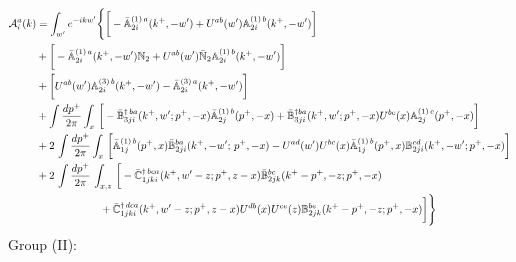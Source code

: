 \documentclass[10pt]{article}
\def\mf#1{\mathbb{#1}}
\numberwithin{equation}{section}
\begin{document}
\begin{align}
         {\cal A}^{a}_{i}(k) & = \int_{w^{\prime}}e^{-ikw^{\prime}} \Bigg\{\bigg[-\bar{\mf{A}}^{(1)\,a}_{2i}(k^{+},-w^{\prime})+U^{ab}(w^{\prime})\mf{A}^{(1)\, b}_{2i}(k^{+},
         - w^{\prime})\bigg]\notag \\ & +\bigg[-\bar{\mf{A}}^{(1)\,a}_{2i}(k^{+},-w^{\prime})\mf{N}_{2}+ U^{ab}(w^{\prime})\bar{\mf{N}}_{2}\mf{A}^{ (1)\, b}_{2i}(k^{+},-w^{\prime})\bigg]\notag 
         \\ & +\bigg[U^{ab}(w^{\prime})\mf{A}^{(3)\, b}_{2i}(k^{+},- w^{\prime})-\Bar{\mf{A}}^{(3)\, a}_{2i}(k^{+}, - w^{\prime})\bigg]\notag 
         \\ & 
         +\int \frac{dp^{+}}{2\pi}\int_{x}\,\bigg[-\Bar{\mf{B}}^{\dagger\, ba}_{3ji}(k^{+}, w^{\prime}; p^{+}, -x)\Bar{\mf{A}}^{(1)\,b}_{2j}(p^{+}, - x)
         + \Bar{\mf{B}}^{\dagger ba}_{3ji}(k^{+},w^{\prime}; p^{+},-x) U^{bc}(x) \mf{A}^{(1)\, c}_{2j}(p^{+},- x)\bigg]\notag
         \\ & 
         +2\,\int \frac{dp^{+}}{2\pi}\int_{x}\,\bigg[ \Bar{\mf{A}}^{(1)\, b}_{1j}(p^{+}, x)\Bar{\mf{B}}^{ba}_{2ji}(k^{+},-w^{\prime};\,p^{+}, -x) -U^{ad}(w^\prime)U^{bc}(x) \bar{\mf{A}}^{(1)\, b}_{1j}(p^+,x) {\mf{B}}^{cd}_{2ji} (k^+, -w^\prime;p^+, -x)\bigg]\notag 
         \\ & 
         +2\, \int \frac{dp^{+}}{2\pi}\,\int_{x,z}\, \bigg[-\Bar{\mf{C}}^{\dagger\, bca}_{1jki}(k^{+},w^{\prime}-z;p^{+},z-x)\Bar{\mf{B}}^{bc}_{2jk}(k^{+}-p^{+},- z;p^{+},-x)
         \notag \\ & \qquad \qquad \qquad  +\bar{\mf{C}}^{\dagger\, dca}_{1jki}(k^+,w^\prime-z; p^+, z-x)  
                 U^{db}(x)
                 U^{ce}(z) 
                {\mf{B}}^{be}_{2jk} (k^{+}-p^+, -z; p^+, -x) \bigg] \Bigg\}
    \end{align}   
Group (II): 
\end{document}
